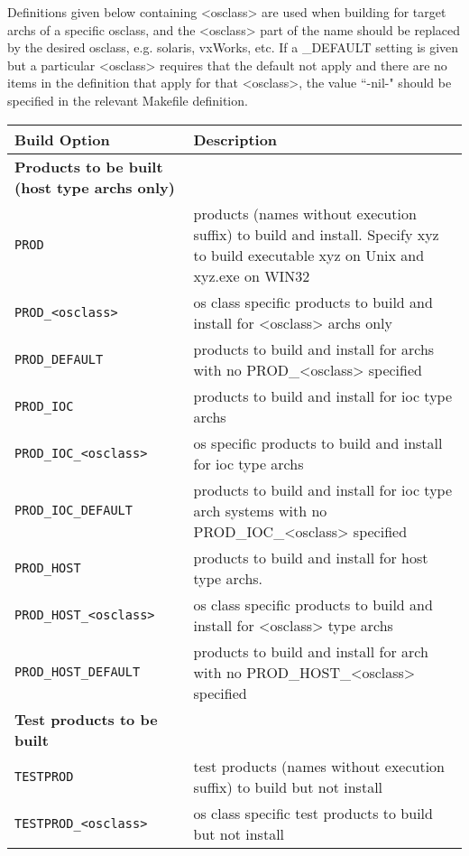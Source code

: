 Definitions given below containing \textless{}osclass\textgreater{} are used when building for target archs of a specific osclass, and the 
\textless{}osclass\textgreater{} part of the name should be replaced by the desired osclass, e.g. solaris, vxWorks, etc. If a \_DEFAULT setting is 
given but a particular \textless{}osclass\textgreater{} requires that the default not apply and there are no items in the definition that apply for 
that \textless{}osclass\textgreater{}, the value ``-nil-" should be specified in the relevant Makefile definition.
\begin{center}
\begin{longtable}{p{2.94784in}p{3.76247in}}
\textbf{Build Option} & \textbf{Description}\\
\hline \hline
\textbf{Products to be built (host type archs only)} & \\
\hline
\verb|PROD| & products (names without execution suffix) to build and install. Specify xyz to build executable xyz on Unix and xyz.exe on WIN32\\
\verb|PROD_<osclass>| & os class specific products to build and install for \textless{}osclass\textgreater{} archs only\\
\verb|PROD_DEFAULT| & products to build and install for archs with no PROD\_\textless{}osclass\textgreater{} specified\\
\verb|PROD_IOC| & products to build and install for ioc type archs\\
\verb|PROD_IOC_<osclass>| & os specific products to build and install for ioc type archs\\
\verb|PROD_IOC_DEFAULT| & products to build and install for ioc type arch systems with no PROD\_IOC\_\textless{}osclass\textgreater{} specified\\
\verb|PROD_HOST| & products to build and install for host type archs. \\
\verb|PROD_HOST_<osclass>| & os class specific products to build and install for \textless{}osclass\textgreater{} type archs\\
\verb|PROD_HOST_DEFAULT| & products to build and install for arch with no PROD\_HOST\_\textless{}osclass\textgreater{} specified\\
\textbf{Test products to be built} & \\
\hline
\verb|TESTPROD| & test products (names without execution suffix) to build but not install \\
\verb|TESTPROD_<osclass>| & os class specific test products to build but not install\\

\end{longtable}
\end{center}
